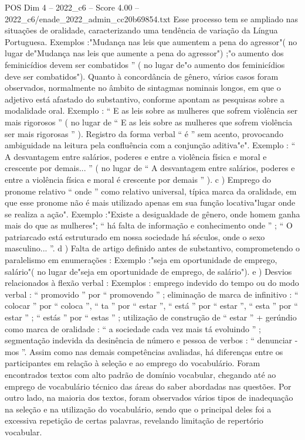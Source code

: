 \begin{textsample}{POS Dim 4 – 2022\_c6 – Score 4.00 – 2022\_c6/enade\_2022\_admin\_cc20b69854.txt}
Esse processo tem se ampliado nas situações de oralidade, caracterizando uma tendência de variação da Língua Portuguesa.
Exemplos :"Mudança nas leis que aumentem a pena do agressor"( no lugar de"Mudança nas leis que aumente a pena do agressor") ;"o aumento dos feminicídios devem ser combatidos ” ( no lugar de"o aumento dos feminicídios deve ser combatidos").
Quanto à concordância de gênero, vários casos foram observados, normalmente no âmbito de sintagmas nominais longos, em que o adjetivo está afastado do substantivo, conforme apontam as pesquisas sobre a modalidade oral.
Exemplo : “ E as leis sobre as mulheres que sofrem violência ser mais rigorosos ” ( no lugar de “ E as leis sobre as mulheres que sofrem violência ser mais rigorosas ” ).
Registro da forma verbal “ é ” sem acento, provocando ambiguidade na leitura pela confluência com a conjunção aditiva"e".
Exemplo : “ A desvantagem entre salários, poderes e entre a violência física e moral e crescente por demais... ” ( no lugar de “ A desvantagem entre salários, poderes e entre a violência física e moral é crescente por demais ” ). c ) Emprego do pronome relativo “ onde ” como relativo universal, típica marca da oralidade, em que esse pronome não é mais utilizado apenas em sua função locativa"lugar onde se realiza a ação".
Exemplo :"Existe a desigualdade de gênero, onde homem ganha mais do que as mulheres"; “ há falta de informação e conhecimento onde ” ; “ O patriarcado está estruturado em nossa sociedade há séculos, onde o sexo masculino... ”. d ) Falta de artigo definido antes de substantivo, comprometendo o paralelismo em enumerações : Exemplo :"seja em oportunidade de emprego, salário"( no lugar de"seja em oportunidade de emprego, de salário"). e ) Desvios relacionados à flexão verbal : Exemplos : emprego indevido do tempo ou do modo verbal : “ promovido ” por “ promovendo ” ; eliminação de marca de infinitivo : “ colocar ” por “ coloca ”, “ ta ” por “ estar ”, “ está ” por “ estar ”, “ esta ” por “ estar ” ; “ estás ” por “ estas ” ; utilização de construção de “ estar ” + gerúndio como marca de oralidade : “ a sociedade cada vez mais tá evoluindo ” ; segmentação indevida da desinência de número e pessoa de verbos : “ denunciar -mos ”.
Assim como nas demais competências avaliadas, há diferenças entre os participantes em relação à seleção e ao emprego do vocabulário.
Foram encontrados textos com alto padrão de domínio vocabular, chegando até ao emprego de vocabulário técnico das áreas do saber abordadas nas questões.
Por outro lado, na maioria dos textos, foram observados vários tipos de inadequação na seleção e na utilização do vocabulário, sendo que o principal deles foi a excessiva repetição de certas palavras, revelando limitação de repertório vocabular.

\end{textsample}

